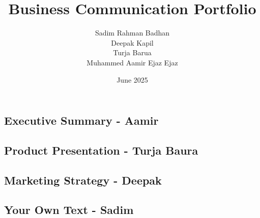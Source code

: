 \documentclass{article}
\title{\centering Business Communication Portfolio}
\author{\centering Sadim Rahman Badhan \\ Deepak Kapil \\ Turja Barua \\ Muhammed Aamir Ejaz Ejaz}
\date{\centering June 2025}
\begin{document}
\begin{center}
    \section*{Executive Summary - Aamir}
\end{center}

\begin{center}
    \section*{Product Presentation - Turja Baura}
\end{center}

\begin{center}
    \section*{Marketing Strategy - Deepak}
\end{center}

\begin{center}
    \section*{Your Own Text - Sadim}
\end{center}
\end{document}
